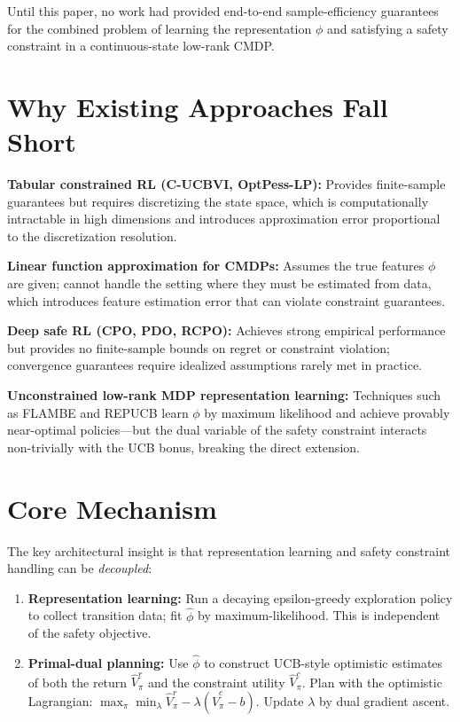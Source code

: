 \documentclass[10pt,twocolumn]{article}
\begin{document}
Until this paper, no work had provided end-to-end sample-efficiency guarantees
for the combined problem of learning the representation $\phi$ and satisfying
a safety constraint in a continuous-state low-rank CMDP.

\section{Why Existing Approaches Fall Short}

\textbf{Tabular constrained RL (C-UCBVI, OptPess-LP):}
Provides finite-sample guarantees but requires discretizing the state space,
which is computationally intractable in high dimensions and introduces
approximation error proportional to the discretization resolution.

\textbf{Linear function approximation for CMDPs:}
Assumes the true features $\phi$ are given; cannot handle the setting where
they must be estimated from data, which introduces feature estimation error
that can violate constraint guarantees.

\textbf{Deep safe RL (CPO, PDO, RCPO):}
Achieves strong empirical performance but provides no finite-sample bounds on
regret or constraint violation; convergence guarantees require idealized
assumptions rarely met in practice.

\textbf{Unconstrained low-rank MDP representation learning:}
Techniques such as FLAMBE and REPUCB learn $\phi$ by maximum likelihood and
achieve provably near-optimal policies---but the dual variable of the safety
constraint interacts non-trivially with the UCB bonus, breaking the direct
extension.

\section{Core Mechanism}

The key architectural insight is that representation learning and safety
constraint handling can be \emph{decoupled}:

\begin{enumerate}[itemsep=2pt,parsep=0pt]
  \item \textbf{Representation learning:} Run a decaying epsilon-greedy
    exploration policy to collect transition data; fit $\hat{\phi}$ by
    maximum-likelihood. This is independent of the safety objective.
  \item \textbf{Primal-dual planning:} Use $\hat{\phi}$ to construct UCB-style
    optimistic estimates of both the return $\hat{V}^r_\pi$ and the constraint
    utility $\hat{V}^c_\pi$. Plan with the optimistic Lagrangian:
    $\max_\pi \min_\lambda \hat{V}^r_\pi - \lambda(\hat{V}^c_\pi - b)$.
    Update $\lambda$ by dual gradient ascent.
\end{enumerate}
\end{document}
